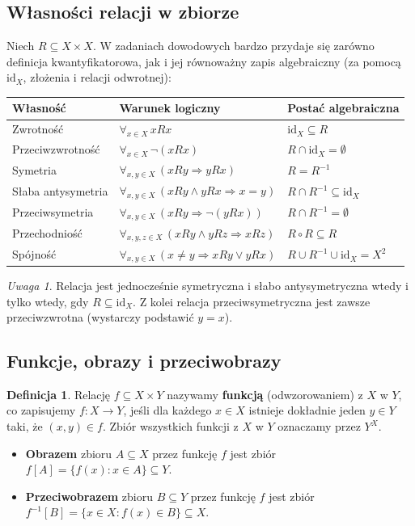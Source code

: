 \documentclass[11pt, a4paper]{article}
\theoremstyle{definition}
\newtheorem{definicja}{Definicja}[section]
\theoremstyle{plain}
\theoremstyle{remark}
\newtheorem*{uwaga}{Uwaga}
\begin{document}
\subsection{Własności relacji w zbiorze}

Niech $R \subseteq X \times X$. W zadaniach dowodowych bardzo przydaje się zarówno definicja kwantyfikatorowa, jak i jej równoważny zapis algebraiczny (za pomocą $\mathrm{id}_X$, złożenia i relacji odwrotnej):

\begin{center}
\small
\begin{tabularx}{\textwidth}{l X l}
\toprule
\textbf{Własność} & \textbf{Warunek logiczny} & \textbf{Postać algebraiczna} \\
\midrule
Zwrotność & $\forall_{x \in X}\, x R x$ & $\mathrm{id}_X \subseteq R$ \\
Przeciwzwrotność & $\forall_{x \in X}\, \neg(x R x)$ & $R \cap \mathrm{id}_X = \emptyset$ \\
Symetria & $\forall_{x, y \in X}\, (x R y \Rightarrow y R x)$ & $R = R^{-1}$ \\
Słaba antysymetria & $\forall_{x, y \in X}\, (x R y \land y R x \Rightarrow x = y)$ & $R \cap R^{-1} \subseteq \mathrm{id}_X$ \\
Przeciwsymetria & $\forall_{x, y \in X}\, (x R y \Rightarrow \neg(y R x))$ & $R \cap R^{-1} = \emptyset$ \\
Przechodniość & $\forall_{x, y, z \in X}\, (x R y \land y R z \Rightarrow x R z)$ & $R \circ R \subseteq R$ \\
Spójność & $\forall_{x, y \in X}\, (x \neq y \Rightarrow x R y \lor y R x)$ & $R \cup R^{-1} \cup \mathrm{id}_X = X^2$ \\
\bottomrule
\end{tabularx}
\end{center}

\begin{uwaga}
Relacja jest jednocześnie symetryczna i słabo antysymetryczna wtedy i tylko wtedy, gdy $R \subseteq \mathrm{id}_X$. Z kolei relacja przeciwsymetryczna jest zawsze przeciwzwrotna (wystarczy podstawić $y = x$).
\end{uwaga}

\subsection{Funkcje, obrazy i przeciwobrazy}

\begin{definicja}
Relację $f \subseteq X \times Y$ nazywamy \textbf{funkcją} (odwzorowaniem) z $X$ w $Y$, co zapisujemy $f : X \to Y$, jeśli dla każdego $x \in X$ istnieje dokładnie jeden $y \in Y$ taki, że $(x, y) \in f$. Zbiór wszystkich funkcji z $X$ w $Y$ oznaczamy przez $Y^X$.
\begin{itemize}
    \item \textbf{Obrazem} zbioru $A \subseteq X$ przez funkcję $f$ jest zbiór $f[A] = \{f(x) : x \in A\} \subseteq Y$.
    \item \textbf{Przeciwobrazem} zbioru $B \subseteq Y$ przez funkcję $f$ jest zbiór $f^{-1}[B] = \{x \in X : f(x) \in B\} \subseteq X$.
\end{itemize}
\end{definicja}
\end{document}

